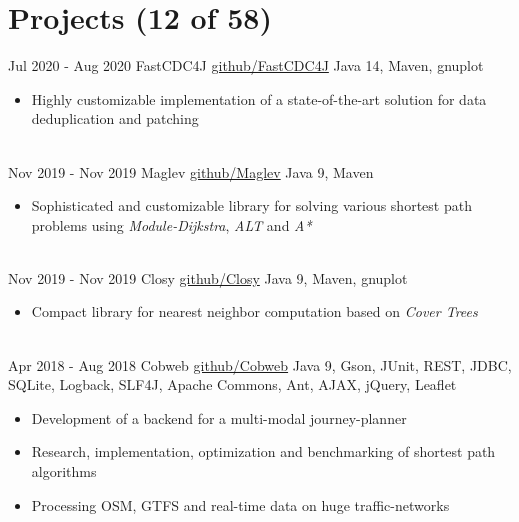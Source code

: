 \documentclass[letterpaper]{twentysecondcv} %
\begin{document}
\vspace{6mm}


\section{Projects (12 of 58)}
\begin{twenty} %
	\twentyitem
    		{Jul 2020 -}
		{Aug 2020}
        		{FastCDC4J}
        		{\href{https://github.com/Zabuzard/FastCDC4J}{github/FastCDC4J}}
        		{Java 14, Maven, gnuplot}
        		{\begin{itemize}
        			\item Highly customizable implementation of a state-of-the-art solution for data deduplication and patching
        		\end{itemize}}\\
	\twentyitem
    		{Nov 2019 -}
		{Nov 2019}
        		{Maglev}
        		{\href{https://github.com/Zabuzard/Maglev}{github/Maglev}}
        		{Java 9, Maven}
        		{\begin{itemize}
        			\item Sophisticated and customizable library for solving various shortest path problems using \textit{Module-Dijkstra}, \textit{ALT} and \textit{A*}
        		\end{itemize}}\\
	\twentyitem
    		{Nov 2019 -}
		{Nov 2019}
        		{Closy}
        		{\href{https://github.com/Zabuzard/Closy}{github/Closy}}
        		{Java 9, Maven, gnuplot}
        		{\begin{itemize}
        			\item Compact library for nearest neighbor computation based on \textit{Cover Trees}
        		\end{itemize}}\\
	\twentyitem
    		{Apr 2018 -}
		{Aug 2018}
        		{Cobweb}
        		{\href{https://github.com/Zabuzard/Cobweb}{github/Cobweb}}
        		{Java 9, Gson, JUnit, REST, JDBC, SQLite, Logback, SLF4J, Apache Commons, Ant, AJAX, jQuery, Leaflet}
        		{\begin{itemize}
        			\item Development of a backend for a multi-modal journey-planner
        			\item Research, implementation, optimization and benchmarking of shortest path algorithms
        			\item Processing OSM, GTFS and real-time data on huge traffic-networks
        		\end{itemize}}
\end{twenty}
\end{document}
